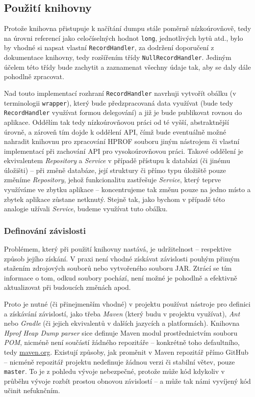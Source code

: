 \subsection{Použití knihovny}
Protože knihovna přistupuje k načítání dumpu stále poměrně nízkoúrovňově, tedy na úrovni referencí jako celočíselných hodnot \texttt{long}, jednotlivých bytů atd., bylo by vhodné si napsat vlastní \texttt{RecordHandler}, za dodržení doporučení z dokumentace knihovny, tedy rozšířením třídy \texttt{NullRecordHandler}. Jediným účelem této třídy bude zachytit a zaznamenat všechny údaje tak, aby se daly dále pohodlně zpracovat. 

Nad touto implementací rozhraní \texttt{RecordHandler} navrhuji vytvořít obálku (v terminologii \texttt{wrapper}), který bude předzpracovaná data využívat (bude tedy \texttt{RecordHandler} využívat formou delegování) a již je bude publikovat rovnou do aplikace. Oddělím tak tedy nízkoúrovňovou práci od té vyšší, abstraktnější úrovně, a zároveň tím dojde k oddělení API, čímž bude eventuálně možné nahradit knihovnu pro zpracování HPROF souboru jiným nástrojem či vlastní implementací při zachování API pro vysokoúrovňovou práci. Takové oddělení je ekvivalentem \textit{Repository} a \textit{Service} v případě přístupu k databázi (či jinému úložišti) -- při změně databáze, její struktury či přímo typu úložiště pouze změníme \textit{Repository}, jehož funkcionalitu zastřešuje \textit{Service}, který teprve využíváme ve zbytku aplikace -- koncentrujeme tak změnu pouze na jedno místo a zbytek aplikace zůstane netknutý. Stejně tak, jako bychom v případě této analogie užívali \textit{Service}, budeme využívat tuto obálku.

\subsubsection{Definování závislosti}
Problémem, který při použití knihovny nastává, je udržitelnost -- respektive způsob jejího získání. V praxi není vhodné získávat závislosti pouhým přimým stažením zdrojových souborů nebo vytvořeného souboru JAR. Ztrácí se tím informace o tom, odkud soubory pochází, není možné je pohodlně a efektivně aktualizovat při budoucích změnách apod.

Proto je nutné (či přinejmenším vhodné) v projektu používat nástroje pro definici a získávání závislostí, jako třeba \textit{Maven} (který budu v projektu využívat), \textit{Ant} nebo \textit{Gradle} (či jejich ekvivalentů v dalších jazycích a platformách). Knihovna \textit{Hprof Heap Dump parser} sice definuje Maven modul prostřednictvím souboru \textit{POM}, nicméně není součástí žádného repozitáře -- konkrétně toho defaultního, tedy \url{maven.org}. Existují způsoby, jak proměnit v Maven repozitář přímo GitHub -- nicméně repozitář projektu nedefinuje žádnou verzi či stabilní větev, pouze \texttt{master}. To je z pohledu vývoje nebezpečné, protože může kód kdykoliv v průběhu vývoje rozbít prostou obnovou závislostí -- a může tak námi vyvíjený kód učinit nefuknčním.


